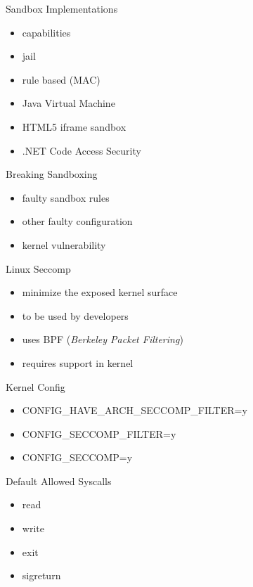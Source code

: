 \documentclass{curs}
\begin{document}
\begin{frame}{Sandbox Implementations}
  \begin{itemize}
    \item capabilities
    \item jail
    \item rule based (MAC)
    \item Java Virtual Machine
    \item HTML5 iframe sandbox
    \item .NET Code Access Security
  \end{itemize}
\end{frame}

\begin{frame}{Breaking Sandboxing}
  \begin{itemize}
    \pause \item faulty sandbox rules
    \pause \item other faulty configuration
    \pause \item kernel vulnerability
  \end{itemize}
\end{frame}

\begin{frame}{Linux Seccomp}
  \begin{itemize}
    \item minimize the exposed kernel surface
    \item to be used by developers
    \item uses BPF (\textit{Berkeley Packet Filtering})
    \item requires support in kernel
  \end{itemize}
\end{frame}

\begin{frame}{Kernel Config}
\begin{itemize}
  \item CONFIG_HAVE_ARCH_SECCOMP_FILTER=y
  \item CONFIG_SECCOMP_FILTER=y
  \item CONFIG_SECCOMP=y
\end{itemize}
\end{frame}

\begin{frame}{Default Allowed Syscalls}
  \begin{itemize}
      \item read
      \item write
      \item exit
      \item sigreturn
  \end{itemize}
\end{frame}
\end{document}
